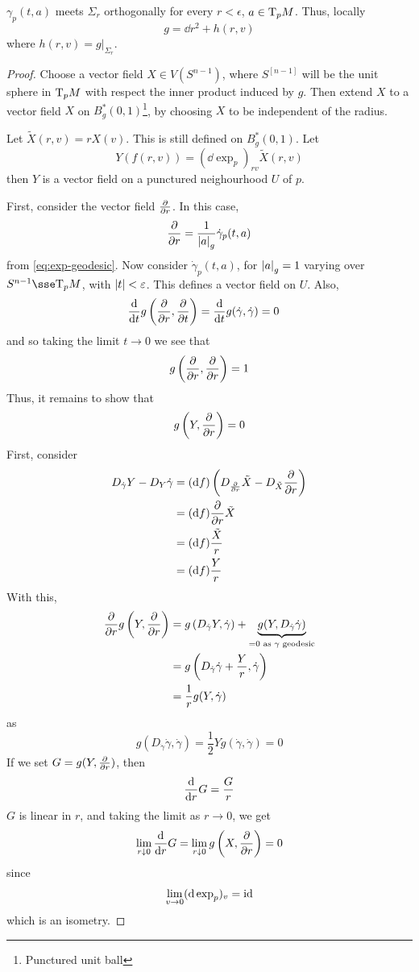 \documentclass{article}
\begin{document}
\begin{lemma}
    [Gauss] \(\gamma_p(t, a)\) meets \(\Sigma_r\) orthogonally for every \(r < \epsilon\), \(a \in \mathrm{T}_pM\). Thus, locally
    \[g = \dd r^2 + h(r, v)\]
    where \(h(r, v) = g\vert_{\Sigma_r}\).
\end{lemma}

\begin{proof}
    Choose a vector field \(X \in V(S^{n-1})\), where \(S^[n-1]\) will be the unit sphere in \(\mathrm{T}_pM\) with respect the inner product induced by \(g\). Then extend \(X\) to a vector field \(X\) on \(B_g^*(0, 1)\)\footnote{Punctured unit ball}, by choosing \(X\) to be independent of the radius.
    
    Let \(\tilde X(r, v) = rX(v)\). This is still defined on \(B_g^*(0, 1)\). Let
    \[Y(f(r, v)) = (\dd \exp_p)_{rv}\tilde X(r, v)\]
    then \(Y\) is a vector field on a punctured neighourhood \(U\) of \(p\). 

    First, consider the vector field \(\pdv{r}\). In this case,
    \[\pdv{r} = \frac{1}{\abs{a}_g}\dot \gamma_p(t, a)\]
    from \cref{eq:exp-geodesic}. Now consider \(\dot\gamma_p(t, a)\), for \(\abs{a}_g = 1\) varying over \(S^{n-1} \sse \T_pM\), with \(\abs{t} < \varepsilon\). This defines a vector field on \(U\). Also,
    \begin{align*}
        \dv{t}g\left(\pdv{r}, \pdv{t}\right) &= \dv{t}g(\dot\gamma, \dot\gamma) = 0
    \end{align*}
    and so taking the limit \(t \to 0\) we see that
    \[g\left(\pdv{r}, \pdv{r}\right) = 1\]
    Thus, it remains to show that
    \[g\left(Y, \pdv{r}\right) = 0\]
    First, consider
    \begin{align*}
        D_{\dot\gamma}Y - D_Y\dot\gamma &= (\dd f)\left(D_{\pdv{r}}\tilde X - D_{\tilde X}\pdv{r}\right) \\
        &= (\dd f)\pdv{r}\tilde X \\
        &= (\dd f)\frac{\tilde X}{r} \\
        &= (\dd f)\frac{Y}{r}
    \end{align*}
    With this,
    \begin{align*}
        \pdv{r}g\left(Y, \pdv{r}\right) &= g\left(D_{\dot\gamma}Y, \dot\gamma\right) + \underbrace{g(Y, D_{\dot\gamma}\dot\gamma)}_{=0 \text{ as }\gamma\text{ geodesic}} \\
        &= g\left(D_{\dot\gamma}\dot\gamma + \frac{Y}{r}, \dot\gamma\right) \\
        &= \frac{1}{r}g(Y, \dot\gamma)
    \end{align*}
    as
    \[g(D_{\dot\gamma}\dot\gamma, \dot\gamma) = \frac{1}{2}Yg(\dot\gamma, \dot\gamma) = 0\]
    If we set \(G = g(Y, \pdv{r})\), then
    \[\dv{r}G = \frac{G}{r}\]
    \(G\) is linear in \(r\), and taking the limit as \(r \to 0\), we get
    \[\lim_{r \downarrow 0}\dv{r}G = \lim_{r \downarrow 0}g\left(X, \pdv{r}\right) = 0\]
    since
    \[\lim_{v \to 0} (\dd \exp_p)_v = \operatorname{id}\]
    which is an isometry.
\end{proof}
\end{document}
